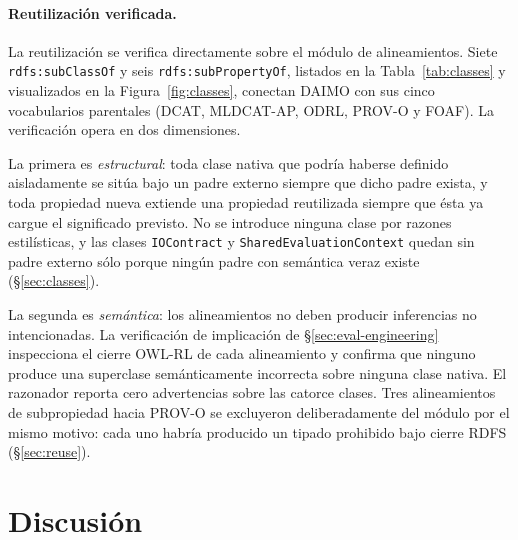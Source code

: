 \documentclass[11pt,a4paper]{article}
\newcommand{\code}[1]{\texttt{#1}}
\begin{document}
\paragraph{Reutilización verificada.}\label{sec:eval-reuse}

La reutilización se verifica directamente sobre el módulo de alineamientos. Siete \code{rdfs:subClassOf} y seis \code{rdfs:subPropertyOf}, listados en la Tabla~\ref{tab:classes} y visualizados en la Figura~\ref{fig:classes}, conectan DAIMO con sus cinco vocabularios parentales (DCAT, MLDCAT-AP, ODRL, PROV-O y FOAF). La verificación opera en dos dimensiones.

La primera es \emph{estructural}: toda clase nativa que podría haberse definido aisladamente se sitúa bajo un padre externo siempre que dicho padre exista, y toda propiedad nueva extiende una propiedad reutilizada siempre que ésta ya cargue el significado previsto. No se introduce ninguna clase por razones estilísticas, y las clases \code{IOContract} y \code{SharedEvaluationContext} quedan sin padre externo sólo porque ningún padre con semántica veraz existe (§\ref{sec:classes}).

La segunda es \emph{semántica}: los alineamientos no deben producir inferencias no intencionadas. La verificación de implicación de §\ref{sec:eval-engineering} inspecciona el cierre OWL-RL de cada alineamiento y confirma que ninguno produce una superclase semánticamente incorrecta sobre ninguna clase nativa. El razonador reporta cero advertencias sobre las catorce clases. Tres alineamientos de subpropiedad hacia PROV-O se excluyeron deliberadamente del módulo por el mismo motivo: cada uno habría producido un tipado prohibido bajo cierre RDFS (§\ref{sec:reuse}).

\section{Discusión}\label{sec:discussion}
\end{document}
